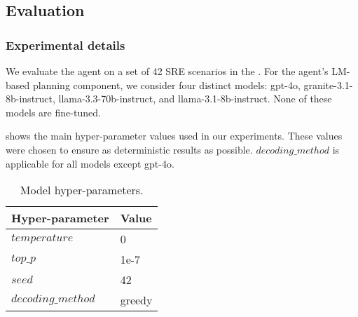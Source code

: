 \subsection{\bench Evaluation}
\label{ss:sre-evaluation}

\subsubsection{Experimental details}

We evaluate the \lumyn agent on a set of 42 SRE scenarios in the \bench. For the agent’s LM-based planning component, we consider four distinct models: gpt-4o, granite-3.1-8b-instruct, llama-3.3-70b-instruct, and llama-3.1-8b-instruct. None of these models are fine-tuned.

 shows the main hyper-parameter values used in our experiments. These values were chosen to ensure as deterministic results as possible. $decoding\_method$ is applicable for all models except gpt-4o. 


\begin{table}[h]
    \centering
    \small
    \begin{threeparttable}
        \caption{Model hyper-parameters.}
        \begin{tabular}{p{3.5cm}l}
            \toprule
           \textbf{Hyper-parameter} &  \textbf{Value} \\ 
 \midrule
$temperature$ & 0 \\
$top\_p$ & 1e-7\\
$seed$ & 42 \\
$decoding\_method$ & greedy \\ 
\bottomrule
\end{tabular}
\label{tab:sre-model-param}
\end{threeparttable}
\end{table}



